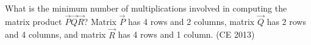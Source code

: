     \item What is the minimum number of multiplications involved in computing the matrix product $\vec{P}\vec{Q}\vec{R}$? Matrix $\vec{P}$ has 4 rows and 2 columns, matrix $\vec{Q}$ has 2 rows and 4 columns, and matrix $\vec{R}$ has 4 rows and 1 column. \hfill (CE 2013)
    
